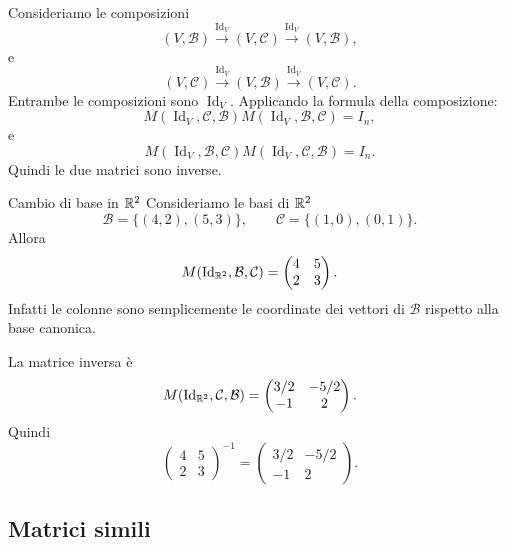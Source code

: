 \documentclass[a4paper]{article}
\begin{document}
\begin{snippetproof}{}
    Consideriamo le composizioni
    \[
        (V,\mathcal{B})
        \xrightarrow{\operatorname{Id}_V}
        (V,\mathcal{C})
        \xrightarrow{\operatorname{Id}_V}
        (V,\mathcal{B}),
    \]
    e
    \[
        (V,\mathcal{C})
        \xrightarrow{\operatorname{Id}_V}
        (V,\mathcal{B})
        \xrightarrow{\operatorname{Id}_V}
        (V,\mathcal{C}).
    \]
    Entrambe le composizioni sono \(\operatorname{Id}_V\). Applicando la formula della composizione:
    \[
        M(\operatorname{Id}_V,\mathcal{C},\mathcal{B})
        M(\operatorname{Id}_V,\mathcal{B},\mathcal{C})
        =
        I_n,
    \]
    e
    \[
        M(\operatorname{Id}_V,\mathcal{B},\mathcal{C})
        M(\operatorname{Id}_V,\mathcal{C},\mathcal{B})
        =
        I_n.
    \]
    Quindi le due matrici sono inverse.
\end{snippetproof}

\begin{snippetexample}{Cambio di base in \(\mathbb{R}^2\)}
    Consideriamo le basi di \(\mathbb{R}^2\)
    \[
        \mathcal{B}=\{(4,2),(5,3)\},
        \qquad
        \mathcal{C}=\{(1,0),(0,1)\}.
    \]
    Allora
    \[
        M(\operatorname{Id}_{\mathbb{R}^2},\mathcal{B},\mathcal{C})
        =
        \begin{pmatrix}
            4 & 5\\
            2 & 3
        \end{pmatrix}.
    \]
    Infatti le colonne sono semplicemente le coordinate dei vettori di \(\mathcal{B}\) rispetto alla base canonica.

    La matrice inversa è
    \[
        M(\operatorname{Id}_{\mathbb{R}^2},\mathcal{C},\mathcal{B})
        =
        \begin{pmatrix}
            3/2 & -5/2\\
            -1 & 2
        \end{pmatrix}.
    \]
    Quindi
    \[
        \begin{pmatrix}
            4 & 5\\
            2 & 3
        \end{pmatrix}^{-1}
        =
        \begin{pmatrix}
            3/2 & -5/2\\
            -1 & 2
        \end{pmatrix}.
    \]
\end{snippetexample}

\subsection{Matrici simili}
\end{document}
